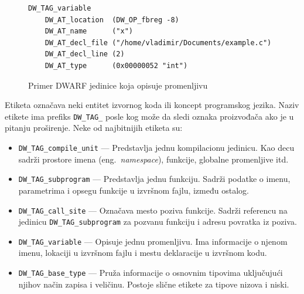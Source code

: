 \documentclass[12pt,oneside]{memoir}
\begin{document}
\begin{figure}[!ht]
\begin{verbatim}
DW_TAG_variable
    DW_AT_location  (DW_OP_fbreg -8)
    DW_AT_name      ("x")
    DW_AT_decl_file ("/home/vladimir/Documents/example.c")
    DW_AT_decl_line (2)
    DW_AT_type      (0x00000052 "int")
\end{verbatim}
\caption{Primer DWARF jedinice koja opisuje promenljivu}
\label{lst:dwarf_variable}
\end{figure}

Etiketa označava neki entitet izvornog koda ili koncept programskog jezika.
Naziv etikete ima prefiks \verb|DW_TAG_| posle kog može da sledi oznaka proizvođača ako je u pitanju proširenje.
Neke od najbitnijih etiketa su:
\begin{itemize}
  \item \verb|DW_TAG_compile_unit| --- Predstavlja jednu kompilacionu jedinicu. Kao decu sadrži prostore imena (eng.~{\em namespace}), funkcije, globalne promenljive itd.
  \item \verb|DW_TAG_subprogram| --- Predstavlja jednu funkciju. Sadrži podatke o imenu, parametrima i opsegu funkcije u izvršnom fajlu, između ostalog.
  \item \verb|DW_TAG_call_site| --- Označava mesto poziva funkcije. Sadrži referencu na jedinicu \verb|DW_TAG_subprogram| za pozvanu funkciju i adresu povratka iz poziva.
  \item \verb|DW_TAG_variable| --- Opisuje jednu promenljivu. Ima informacije o njenom imenu, lokaciji u izvršnom fajlu i mestu deklaracije u izvršnom kodu.
  \item \verb|DW_TAG_base_type| --- Pruža informacije o osnovnim tipovima uključujući njihov način zapisa i veličinu. Postoje slične etikete za tipove nizova i niski.
\end{itemize}
\end{document}
